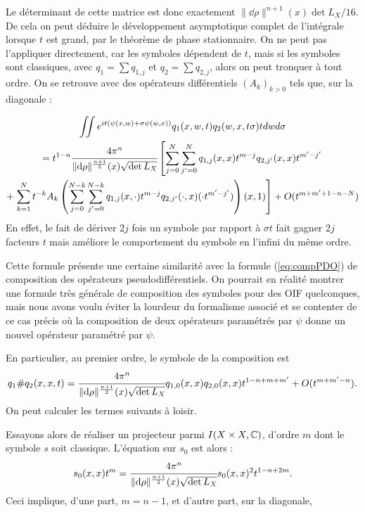 Le déterminant de cette matrice est donc exactement $\|\dd\rho\|^{n+1}(x)\det L_X/16$. De cela on peut déduire le développement asymptotique complet de l'intégrale lorsque $t$ est grand, par le théorème de phase stationnaire. On ne peut pas l'appliquer directement, car les symboles dépendent de $t$, mais si les symboles sont classiques, avec $q_1 = \sum q_{1,j}$ et $q_2 = \sum q_{2,j}$, alors on peut tronquer à tout ordre. On se retrouve avec des opérateurs différentiels $(A_k)_{k >0}$ tels que, sur la diagonale :

\begin{multline*}
  \iint e^{it(\psi(x,w)+\sigma \psi(w,x))}q_1(x,w,t)q_2(w,x,t\sigma)tdwd\sigma \\= t^{1-n}\cfrac{4\pi^n}{\|\mathrm{d}\rho\|^{\frac{n+1}{2}}(x)\sqrt{\det L_X}}\left[\sum_{j=0}^{N}\sum_{j'=0}^{N} q_{1,j}(x,x)t^{m-j}q_{2,j'}(x,x)t^{m'-j'}\right. \\+ \left.\sum_{k=1}^{N}t^{-k}A_k\left(\sum_{j=0}^{N-k}\sum_{j'=0}^{N-k} q_{1,j}(x,\cdot)t^{m-j}q_{2,j'}(\cdot,x)(\cdot t^{m'-j'})\right)(x,1)\right] + O(t^{m+m'+1-n-N})
\end{multline*}
En effet, le fait de dériver $2j$ fois un symbole par rapport à $\sigma t$ fait gagner $2j$ facteurs $t$ mais améliore le comportement du symbole en l'infini du même ordre.

\begin{rem}
Cette formule présente une certaine similarité avec la formule (\ref{eq:compPDO}) de composition des opérateurs pseudodifférentiels. On pourrait en réalité montrer une formule très générale de composition des symboles pour des OIF quelconques, mais nous avons voulu éviter la lourdeur du formalisme associé et se contenter de ce cas précis où la composition de deux opérateurs paramétrés par $\psi$ donne un nouvel opérateur paramétré par $\psi$.
\end{rem}

En particulier, au premier ordre, le symbole de la composition est
\begin{equation*}
  q_1\#q_2(x,x,t) = \cfrac{4\pi^n}{\|\mathrm{d}\rho\|^{\frac{n+1}{2}}(x)\sqrt{\det L_X}}q_{1,0}(x,x)q_{2,0}(x,x)t^{1-n+m+m'} + O(t^{m+m'-n}).
\end{equation*}
On peut calculer les termes suivants à loisir.

Essayons alors de réaliser un projecteur parmi $I(X\times X,\mathbb{C})$, d'ordre $m$ dont le symbole $s$ soit classique. L'équation sur $s_0$ est alors :
\begin{equation*}
  s_0(x,x)t^m = \cfrac{4\pi^n}{\|\mathrm{d}\rho\|^{\frac{n+1}{2}}(x)\sqrt{\det L_X}}s_0(x,x)^2t^{1-n+2m}.
\end{equation*}
Ceci implique, d'une part, $m=n-1$, et d'autre part, sur la diagonale,

